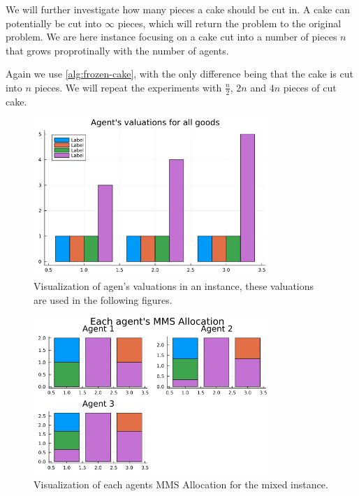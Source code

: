 We will further investigate how many pieces a cake should be cut in. A cake can potentially be cut into $\infty$ pieces, which will return the problem to the original problem. We are here instance focusing on a cake cut into a number of pieces $n$ that grows proprotinally with the number of agents. 

Again we use \autoref{alg:frozen-cake}, with the only difference being that the cake is cut into $n$ pieces. We will repeat the experiments with  $\frac{n}{2}$, $2n$ and $4n$ pieces of cut cake.








\begin{figure}
    \centering
    \includegraphics[width=0.8\textwidth]{assets/plots/visualize_instance.png}
    \caption{Visualization of agen's valuations in an instance, these valuations are used in the following figures.}
    \label{fig:visualize_instance}
\end{figure}

\begin{figure}
    \centering
    \includegraphics[width=0.8\textwidth]{assets/plots/visualize_mms_allocation.png}
    \caption{Visualization of each agents MMS Allocation for the mixed instance.}
    \label{fig:visualize_mms_allocation}
\end{figure}


